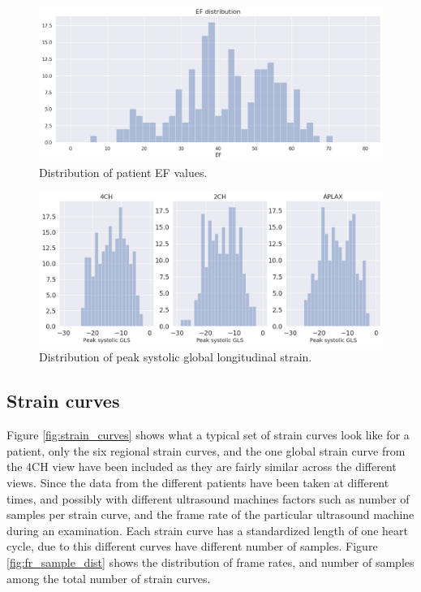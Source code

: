 \begin{figure}[h]
    \begin{center}
    \includegraphics[width=\textwidth]{data-exp/EF_dist.png}
    \end{center}
    \caption{Distribution of patient EF values.}
    \label{fig:EF_dist}
\end{figure}

\begin{figure}
    \begin{center}
    \includegraphics[width=\textwidth]{data-exp/peak_sys_gls_dist.png}
    \end{center}
    \caption{Distribution of peak systolic global longitudinal strain.}
    \label{fig:gls_dist}
\end{figure}

\subsection{Strain curves}
Figure \ref{fig:strain_curves} shows what a typical set of strain curves look like for a patient, only the six regional strain curves, and the one global strain curve from the 4CH view have been included as they are fairly similar across the different views. Since the data from the different patients have been taken at different times, and possibly with different ultrasound machines factors such as number of samples per strain curve, and the frame rate of the particular ultrasound machine during an examination. Each strain curve has a standardized length of one heart cycle, due to this different curves have different number of samples. Figure \ref{fig:fr_sample_dist} shows the distribution of frame rates, and number of samples among the total number of strain curves. \bigskip

